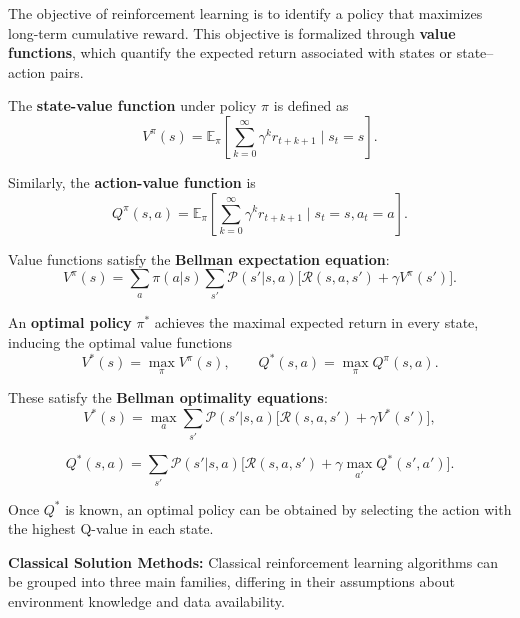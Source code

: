 The objective of reinforcement learning is to identify a policy that maximizes long-term cumulative reward. This objective is formalized through \textbf{value functions}, which quantify the expected return associated with states or state–action pairs.

The \textbf{state-value function} under policy $\pi$ is defined as
\begin{equation}
V^{\pi}(s) = \mathbb{E}_{\pi}\left[\sum_{k=0}^{\infty} \gamma^k r_{t+k+1} \mid s_t = s\right].
\label{eq:value_function}
\end{equation}

Similarly, the \textbf{action-value function} is
\begin{equation}
Q^{\pi}(s,a) = \mathbb{E}_{\pi}\left[\sum_{k=0}^{\infty} \gamma^k r_{t+k+1} \mid s_t = s, a_t = a\right].
\label{eq:q_function}
\end{equation}

Value functions satisfy the \textbf{Bellman expectation equation}:
\begin{equation}
V^{\pi}(s) = \sum_a \pi(a|s) \sum_{s'} \mathcal{P}(s'|s,a)\big[\mathcal{R}(s,a,s') + \gamma V^{\pi}(s')\big].
\label{eq:bellman_expectation}
\end{equation}

An \textbf{optimal policy} $\pi^*$ achieves the maximal expected return in every state, inducing the optimal value functions
\begin{equation}
V^*(s) = \max_{\pi} V^{\pi}(s),
\qquad
Q^*(s,a) = \max_{\pi} Q^{\pi}(s,a).
\label{eq:optimal_values}
\end{equation}

These satisfy the \textbf{Bellman optimality equations}:
\begin{equation}
V^*(s) = \max_a \sum_{s'} \mathcal{P}(s'|s,a)\big[\mathcal{R}(s,a,s') + \gamma V^*(s')\big],
\label{eq:bellman_optimal_v}
\end{equation}

\begin{equation}
Q^*(s,a) = \sum_{s'} \mathcal{P}(s'|s,a)\big[\mathcal{R}(s,a,s') + \gamma \max_{a'} Q^*(s',a')\big].
\label{eq:bellman_optimal_q}
\end{equation}

Once $Q^*$ is known, an optimal policy can be obtained by selecting the action with the highest Q-value in each state.

\textbf{Classical Solution Methods:}  
Classical reinforcement learning algorithms can be grouped into three main families, differing in their assumptions about environment knowledge and data availability.

